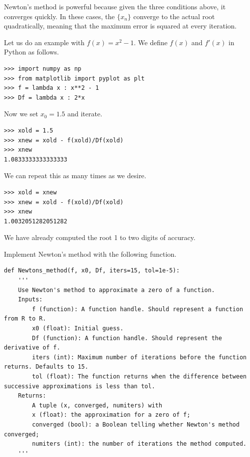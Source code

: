 Newton's method is powerful because given the three conditions above, it converges quickly.
In these cases, the $\{x_n\}$ converge to the actual root quadratically, meaning that the maximum error is squared at every iteration.

Let us do an example with $f(x) = x^2-1$. 
We define $f(x)$ and $f'(x)$ in Python as follows. 
\begin{lstlisting}
>>> import numpy as np
>>> from matplotlib import pyplot as plt
>>> f = lambda x : x**2 - 1
>>> Df = lambda x : 2*x
\end{lstlisting}
Now we set $x_0 = 1.5$ and iterate.
\begin{lstlisting}
>>> xold = 1.5
>>> xnew = xold - f(xold)/Df(xold)
>>> xnew
1.0833333333333333
\end{lstlisting}
We can repeat this as many times as we desire.
\begin{lstlisting}
>>> xold = xnew
>>> xnew = xold - f(xold)/Df(xold)
>>> xnew
1.0032051282051282
\end{lstlisting}
We have already computed the root 1 to two digits of accuracy.


\begin{problem}
\label{prob:newton_arr}
\leavevmode

Implement Newton's method with the following function.
\begin{lstlisting}
def Newtons_method(f, x0, Df, iters=15, tol=1e-5):
    '''
    Use Newton's method to approximate a zero of a function.
    Inputs:
        f (function): A function handle. Should represent a function from R to R.
        x0 (float): Initial guess.
        Df (function): A function handle. Should represent the derivative of f.
        iters (int): Maximum number of iterations before the function returns. Defaults to 15.
        tol (float): The function returns when the difference between successive approximations is less than tol.
    Returns:
        A tuple (x, converged, numiters) with
        x (float): the approximation for a zero of f;
        converged (bool): a Boolean telling whether Newton's method converged;
        numiters (int): the number of iterations the method computed.
    '''
\end{lstlisting}
\end{problem}

